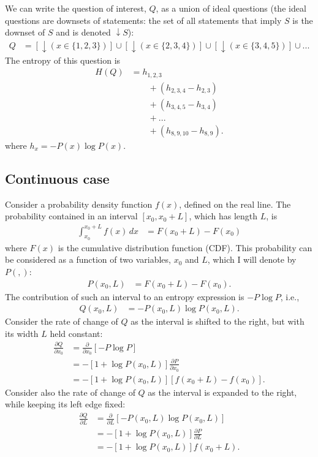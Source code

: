 \documentclass[entropy,article,accept,oneauthor,pdftex,10pt,a4paper]{mdpi}
\begin{document}
We can write the question of interest, $Q$, as a union of ideal questions
(the ideal questions are downsets of statements: the set of all statements
that imply $S$ is the downset of $S$ and is denoted $\downarrow S$):
\begin{align}
Q &= \left[\downarrow (x \in \{1, 2, 3\})\right] \cup
     \left[\downarrow (x \in \{2, 3, 4\})\right] \cup
     \left[\downarrow (x \in \{3, 4, 5\})\right] \cup ...
\end{align}
The entropy of this question is
\begin{align}
H(Q) &= h_{1,2,3}\\
     & \quad \quad + \left(h_{2,3,4} - h_{2,3}\right) \\
     & \quad \quad + \left(h_{3,4,5} - h_{3,4}\right) \\
     & \quad \quad + ... \\
     & \quad \quad + \left(h_{8,9,10} - h_{8,9}\right).
\end{align}
where $h_{x} = -P(x)\log P(x)$.

\subsection*{Continuous case}

Consider a probability density function $f(x)$, defined on the real
line. The probability contained in an interval
$[x_0, x_0 + L]$, which has length $L$, is
\begin{align}
\int_{x_0}^{x_0 + L} f(x) \, dx &= F(x_0 + L) - F(x_0)
\end{align}
where $F(x)$ is the cumulative distribution function (CDF).
This probability can be considered as a function of two variables,
$x_0$ and $L$, which I will denote by $P(,)$:
\begin{align}
P(x_0, L) &= F(x_0 + L) - F(x_0).
\end{align}
The contribution of such an interval to an entropy expression
is $-P\log P$, i.e.,
\begin{align}
Q(x_0, L) &= -P(x_0, L) \log P(x_0, L).
\end{align}
Consider the rate of change of $Q$ as the interval is shifted to
the right, but with its width $L$ held constant:
\begin{align}
\frac{\partial Q}{\partial x_0} &= \frac{\partial}{\partial x_0}
    \left[-P\log P\right] \\
    &= -\left[1 + \log P(x_0, L)\right]\frac{\partial P}{\partial x_0} \\
    &= -\left[1 + \log P(x_0, L)\right]\left[f(x_0 + L) - f(x_0)\right].
\end{align}
Consider also the rate of change of $Q$ as the interval is
expanded to the right, while keeping its left edge fixed:
\begin{align}
\frac{\partial Q}{\partial L} &= \frac{\partial}{\partial L}
    \left[-P(x_0, L) \log P(x_0, L)\right] \\
    &= -\left[1 + \log P(x_0, L)\right]\frac{\partial P}{\partial L} \\
    &= -\left[1 + \log P(x_0, L)\right]f(x_0 + L).
\end{align}
\end{document}
